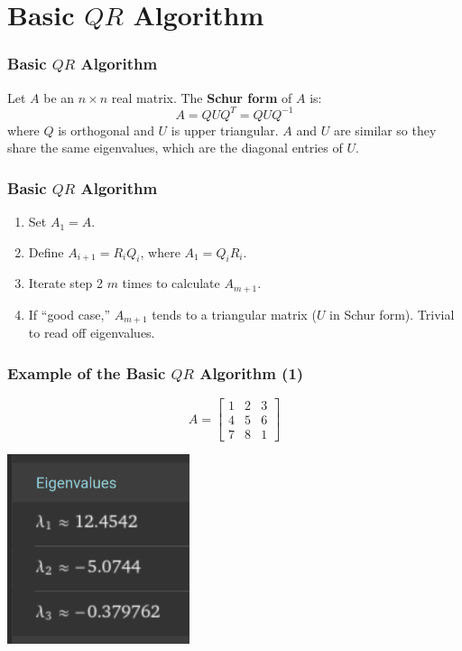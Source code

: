 \documentclass{beamer}
\begin{document}
\section{Basic $QR$ Algorithm}
\frame{\sectionpage}

\begin{frame}
	\frametitle{Basic $QR$ Algorithm}
	\begin{tcolorbox}[title={Schur form},colback=blue!5!white,colframe=blue!75!black,parbox=false]
		Let $A$ be an $n\times n$ real matrix. The \textbf{Schur form} of $A$ is:
		\begin{equation*}
			A=QUQ^T=QUQ^{-1}
		\end{equation*}
		where $Q$ is orthogonal and $U$ is upper triangular. $A$ and $U$ are similar so they share the same eigenvalues, which are the diagonal entries of $U$.
	\end{tcolorbox}
\end{frame}

\begin{frame}
	\frametitle{Basic $QR$ Algorithm}
	\begin{tcolorbox}[title={Basic $QR$ Algorithm},colback=red!5!white,colframe=red!75!black,parbox=false]
		\begin{enumerate}
			\item<1-> Set $A_1=A$.
			\item<2-> Define $A_{i+1}=R_iQ_i$, where $A_1=Q_iR_i$.
			\item<3-> Iterate step 2 $m$ times to calculate $A_{m+1}$.
			\item<4-> If ``good case,'' $A_{m+1}$ tends to a triangular matrix ($U$ in Schur form). Trivial to read off eigenvalues.
		\end{enumerate}
	\end{tcolorbox}
\end{frame}

\begin{frame}
	\frametitle{Example of the Basic $QR$ Algorithm (1)}
	\begin{equation*}
	    A=\begin{bmatrix}
			1 & 2 & 3 \\
			4 & 5 & 6 \\
			7 & 8 & 1
	    \end{bmatrix}
	\end{equation*}
	\begin{center}
		\includegraphics[width=0.4\textwidth]{eigenvalues.png}
	\end{center}
\end{frame}
\end{document}
